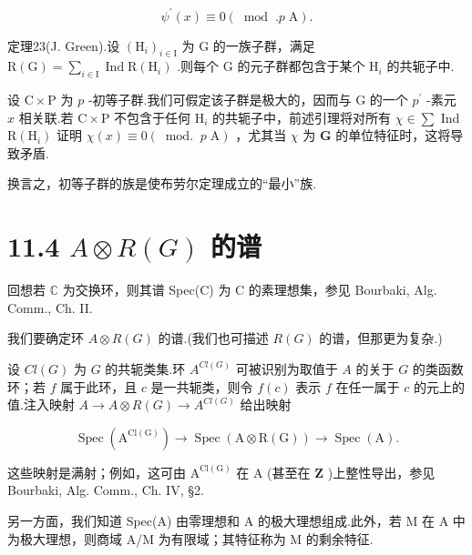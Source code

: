 \documentclass[10pt]{article}
\begin{document}
\[
{\psi }^{\prime }\left( x\right)  \equiv  0\left( {{\;\operatorname{mod}\;.}p\mathrm{\;A}}\right) .
\]

定理23(J. Green).设 \({\left( {\mathrm{H}}_{i}\right) }_{i \in  \mathrm{I}}\) 为 \(\mathrm{G}\) 的一族子群，满足 \(\mathrm{R}\left( \mathrm{G}\right)  = \mathop{\sum }\limits_{{i \in  \mathrm{I}}}\operatorname{Ind}\mathrm{R}\left( {\mathrm{H}}_{i}\right)\) .则每个 \(\mathrm{G}\) 的元子群都包含于某个 \({\mathrm{H}}_{i}\) 的共轭子中.

设 \(\mathrm{C} \times  \mathrm{P}\) 为 \(p\) -初等子群.我们可假定该子群是极大的，因而与 \(\mathrm{G}\) 的一个 \({p}^{\prime }\) -素元 \(x\) 相关联.若 \(\mathrm{C} \times  \mathrm{P}\) 不包含于任何 \({\mathrm{H}}_{i}\) 的共轭子中，前述引理将对所有 \(\chi  \in  \sum\) Ind \(\mathrm{R}\left( {\mathrm{H}}_{i}\right)\) 证明 \(\chi \left( x\right)  \equiv  0\left( {{\;\operatorname{mod.}\;}p\mathrm{\;A}}\right)\) ，尤其当 \(\chi\) 为 \(\mathbf{G}\) 的单位特征时，这将导致矛盾.

换言之，初等子群的族是使布劳尔定理成立的“最小”族.

\section*{11.4 \(A \otimes  R\left( G\right)\) 的谱}

回想若 \(\mathbb{C}\) 为交换环，则其谱 Spec(C) 为 C 的素理想集，参见 Bourbaki, Alg. Comm., Ch. II.

我们要确定环 \(A \otimes  R\left( G\right)\) 的谱.(我们也可描述 \(R\left( G\right)\) 的谱，但那更为复杂.)

设 \({Cl}\left( G\right)\) 为 \(G\) 的共轭类集.环 \({A}^{{Cl}\left( G\right) }\) 可被识别为取值于 \(A\) 的关于 \(G\) 的类函数环；若 \(f\) 属于此环，且 \(c\) 是一共轭类，则令 \(f\left( c\right)\) 表示 \(f\) 在任一属于 \(c\) 的元上的值.注入映射 \(A \rightarrow  A \otimes  R\left( G\right)  \rightarrow  {A}^{{Cl}\left( G\right) }\) 给出映射

\[
\operatorname{Spec}\left( {\mathrm{A}}^{\mathrm{{Cl}}\left( \mathrm{G}\right) }\right)  \rightarrow  \operatorname{Spec}\left( {\mathrm{A} \otimes  \mathrm{R}\left( \mathrm{G}\right) }\right)  \rightarrow  \operatorname{Spec}\left( \mathrm{A}\right) .
\]

这些映射是满射；例如，这可由 \({\mathrm{A}}^{\mathrm{{Cl}}\left( \mathrm{G}\right) }\) 在 \(\mathrm{A}\) (甚至在 \(\mathbf{Z}\) )上整性导出，参见 Bourbaki, Alg. Comm., Ch. IV, §2.

另一方面，我们知道 Spec(A) 由零理想和 A 的极大理想组成.此外，若 M 在 A 中为极大理想，则商域 A/M 为有限域；其特征称为 M 的剩余特征.
\end{document}
